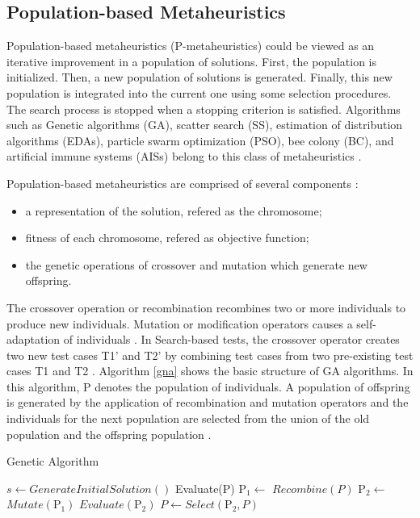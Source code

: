 \documentclass[espaco=umemeio,chapter=TITLE,twoside,openright]{abnt}
\begin{document}
\subsection{Population-based Metaheuristics}

Population-based metaheuristics (P-metaheuristics) could be viewed as an iterative improvement in a population of solutions. First, the population is initialized. Then, a new population of solutions is generated. Finally, this new population is integrated into the current one using some selection procedures. The search process is stopped when a stopping criterion is satisfied. Algorithms such as Genetic algorithms (GA), scatter search (SS), estimation of distribution algorithms (EDAs), particle swarm optimization (PSO), bee colony (BC), and artificial immune systems (AISs) belong to this class of metaheuristics \cite{talbi2009metaheuristics}.

Population-based metaheuristics are comprised of several components \cite{hong2000simultaneously} \cite{shousha2003performance} :

\begin{itemize}
\item a representation of the solution, refered as the chromosome;
\item fitness of each chromosome, refered as objective function;
\item the genetic operations of crossover and mutation which generate new offspring.
\end{itemize}

The crossover operation or recombination recombines two or more individuals to produce new individuals. Mutation or modification operators causes a self-adaptation of individuals \cite{Blum2003}. In Search-based tests, the crossover operator creates two new test cases T1' and T2' by combining test cases from two pre-existing test cases T1 and T2 \cite{Aleti2016}. Algorithm \ref{gna} shows the basic structure of GA algorithms. In this algorithm, P denotes the population of individuals. A population of offspring is generated by the application of recombination and mutation operators and the individuals for the next population are selected from the union of the old population and the offspring population \cite{raidl2010metaheuristic}.


\begin{algorithm}[h]
  \caption{Genetic Algorithm}\label{gna}
  \begin{algorithmic}[1]

    \State $s\gets GenerateInitialSolution()$
    \State Evaluate(P)
    \State $\mbox{P}_1\gets$ $Recombine(P)$
    \State $\mbox{P}_2\gets$ $Mutate(\mbox{P}_1)$
    \State $Evaluate(\mbox{P}_2)$
    \State $P\gets Select(\mbox{P}_2,P)$
    \EndWhile

  \end{algorithmic}
\end{algorithm}
\end{document}
